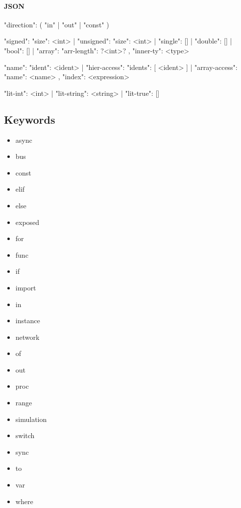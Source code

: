 \documentclass{article}
\begin{document}
\paragraph{JSON}
\begin{jsoncode}
{"direction": ( "in"
              | "out"
              | "const" )
}

{ "signed": { "size": <int> }
| "unsigned": { "size": <int> }
| "single": []
| "double": []
| "bool": []
| "array": { "arr-length": ?<int>?
           , "inner-ty": <type>
           }
}

{ "name": { "ident": <ident> }
| "hier-access": { "idents": [ <ident> ] }
| "array-access": { "name": <name>
                  , "index": <expression>
                  }
}

{ "lit-int": <int>
| "lit-string": <string>
| "lit-true": []
}
\end{jsoncode}

\subsection{Keywords}
\begin{multicols}{3}
  \begin{itemize}
  \item async
  \item bus
  \item const
  \item elif
  \item else
  \item exposed
  \item for
  \item func
  \item if
  \item import
  \item in
  \item instance
  \item network
  \item of
  \item out
  \item proc
  \item range
  \item simulation
  \item switch
  \item sync
  \item to
  \item var
  \item where
  \end{itemize}
\end{multicols}
\end{document}

